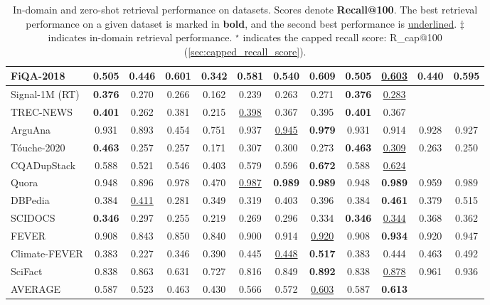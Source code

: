 \begin{table}[t!]
{\begin{tabular}{l | c | c | c c c c c | c c | c c}
   FiQA-2018     & 0.505 & 0.446 & 0.601 & 0.342 & 0.581 & 0.540 & \textbf{0.609} & 0.505 & \underline{0.603} & 0.440 & 0.595\\ \midrule
   Signal-1M (RT)& \textbf{0.376} & 0.270 & 0.266 & 0.162 & 0.239 & 0.263 & 0.271 & \textbf{0.376} & \underline{0.283} \\ \midrule
   TREC-NEWS     & \textbf{0.401} & 0.262 & 0.381 & 0.215 & \underline{0.398} & 0.367 & 0.395 & \textbf{0.401} & 0.367 \\ \midrule
   ArguAna       & 0.931 & 0.893 & 0.454 & 0.751 & 0.937 & \underline{0.945} & \textbf{0.979} & 0.931 & 0.914 & 0.928 & 0.927 \\  
   T\'ouche-2020 & \textbf{0.463} & 0.257 & 0.257 & 0.171 & 0.307 & 0.300 & 0.273 & \textbf{0.463} & \underline{0.309} & 0.263 & 0.250 \\ \midrule 
   CQADupStack   & 0.588 & 0.521 & 0.546 & 0.403 & 0.579 & 0.596 & \textbf{0.672} & 0.588 & \underline{0.624} \\
   Quora         & 0.948 & 0.896 & 0.978 & 0.470 & \underline{0.987} & \textbf{0.989} & \textbf{0.989} & 0.948 & \textbf{0.989} & 0.959 & \colorbox{blue!30}{0.989} \\ \midrule
   DBPedia       & 0.384 & \underline{0.411} & 0.281 & 0.349 & 0.319 & 0.403 & 0.396 & 0.384 & \textbf{0.461} & 0.379 & \colorbox{blue!30}{0.515} \\ \midrule
   SCIDOCS       & \textbf{0.346} & 0.297 & 0.255 & 0.219 & 0.269 & 0.296 & 0.334 & \textbf{0.346} & \underline{0.344} & \colorbox{blue!30}{0.368} & \colorbox{blue!30}{0.362}\\ \midrule
   FEVER         & 0.908 & 0.843 & 0.850 & 0.840 & 0.900 & 0.914 & \underline{0.920} & 0.908 & \textbf{0.934} & 0.920 & \colorbox{blue!30}{0.947} \\ 
   Climate-FEVER & 0.383 & 0.227 & 0.346 & 0.390 & 0.445 & \underline{0.448} & \textbf{0.517} & 0.383 & 0.444 & 0.463 & 0.492 \\ 
   SciFact       & 0.838 & 0.863 & 0.631 & 0.727 & 0.816 & 0.849 & \textbf{0.892} & 0.838 & \underline{0.878} & \colorbox{blue!30}{0.961} & \colorbox{blue!30}{0.936} \\ \midrule
   AVERAGE       & 0.587 & 0.523 & 0.463  & 0.430 & 0.566 & 0.572 & \underline{0.603} & 0.587 & \textbf{0.613} \\ 
        \bottomrule
    \end{tabular}}
    \caption{In-domain and zero-shot retrieval performance on \beir datasets. Scores denote \textbf{Recall@100}. The best retrieval performance on a given dataset is marked in \textbf{bold}, and the second best performance is \underline{underlined}. $\ddagger$ indicates in-domain retrieval performance. $^\star$ indicates the capped recall score: R\_cap@100 (\autoref{sec:capped_recall_score}). }
    \label{tab:results-recall}
\end{table}



